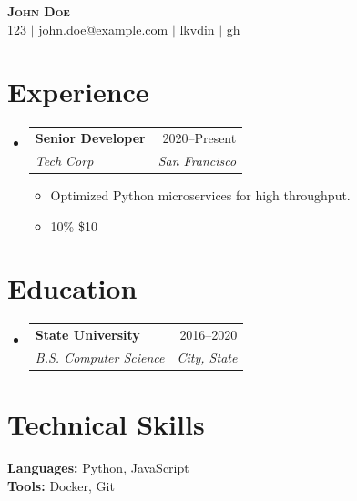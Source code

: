 \documentclass[letterpaper,11pt]{article}
\makeatletter
\newcommand{\resumeItem}[1]{
  \item\small{
    {#1 \vspace{-2pt}}
  }
}
\newcommand{\resumeSubheading}[4]{
  \vspace{-1pt}\item
    \begin{tabular*}{0.97\textwidth}[t]{l@{\extracolsep{\fill}}r}
      \textbf{#1} & #2 \\
      \textit{\small#3} & \textit{\small #4} \\
    \end{tabular*}\vspace{-7pt}
}
\newcommand{\resumeSubHeadingListStart}{\begin{itemize}[leftmargin=0.15in, label={}]}
\newcommand{\resumeSubHeadingListEnd}{\end{itemize}}
\newcommand{\resumeItemListStart}{\begin{itemize}}
\newcommand{\resumeItemListEnd}{\end{itemize}\vspace{-5pt}}
\makeatother
\begin{document}

\begin{center}
    \textbf{\Huge \scshape John Doe} \\ \vspace{1pt}
    \small 123 $|$ \href{mailto:john.doe@example.com}{\underline{ john.doe@example.com }} $|$ 
    \href{https://lkvdin}{\underline{ lkvdin }} $|$
    \href{https://gh}{\underline{ gh }}
    
\end{center}



\section{Experience}
  \resumeSubHeadingListStart

    
    \resumeSubheading
      { Senior Developer }
      { 2020--Present }
      { Tech Corp }
      { San Francisco }
      \resumeItemListStart
        
        \resumeItem{ Optimized Python microservices for high throughput. }
        
        \resumeItem{ 10\% 
 \$10 }
        
      \resumeItemListEnd
    

  \resumeSubHeadingListEnd




\section{Education}
  \resumeSubHeadingListStart
    
    \resumeSubheading
      { State University }
      { 2016--2020 }
      { B.S. Computer Science }
      { City, State }
    
  \resumeSubHeadingListEnd







\section{Technical Skills}
 \begin{itemize}[leftmargin=0.15in, label={}]
    \small{\item{
     
     \textbf{ Languages: }{ Python, JavaScript } \\
     
     \textbf{ Tools: }{ Docker, Git } \\
     
    }}
 \end{itemize}



\end{document}
